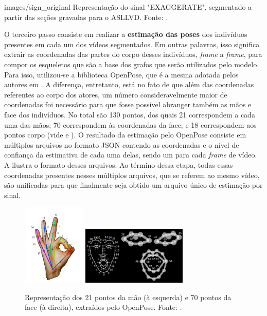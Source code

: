     {images/sign_original}
    {Representação do sinal "EXAGGERATE", segmentado a partir das seções gravadas para o ASLLVD. Fonte: \cite{athitsos-asllvd-2008}.}

O terceiro passo consiste em realizar a \textbf{estimação das poses} dos indivíduos presentes em cada um dos vídeos segmentados. Em outras palavras, isso significa extrair as coordenadas das partes do corpo desses indivíduos, \textit{frame} a \textit{frame}, para compor os esqueletos que são a base dos grafos que serão utilizados pelo modelo. Para isso, utilizou-se a biblioteca OpenPose, que é a mesma adotada pelos autores em \cite{st-gcn-2018}. A diferença, entretanto, está no fato de que além das coordenadas referentes ao corpo dos atores, um número consideravelmente maior de coordenadas foi necessário para que fosse possível abranger também as mãos e face dos indivíduos. No total são 130 pontos, dos quais 21 correspondem a cada uma das mãos; 70 correspondem às coordenadas da face; e 18 correspondem aos pontos corpo (vide  e ). O resultado da estimação pelo OpenPose consiste em múltiplos arquivos no formato JSON contendo as coordenadas e o nível de confiança da estimativa de cada uma delas, sendo um para cada \textit{frame} de vídeo. A  ilustra o formato desses arquivos. Ao término dessa etapa, todas essas coordenadas presentes nesses múltiplos arquivos, que se referem ao mesmo vídeo, são unificadas para que finalmente seja obtido um arquivo único de estimação por sinal.

\begin{figure}[ht]
    \centering
    \includegraphics[width=3cm]{images/keypoints_hand}
    \includegraphics[width=5cm]{images/keypoints_face}
    \caption{Representação dos 21 pontos da mão (à esquerda) e 70 pontos da face (à direita), extraídos pelo OpenPose. Fonte: \cite{openpose-output-2018}.}
    \label{fig:keypoints-face-hand}
\end{figure}

